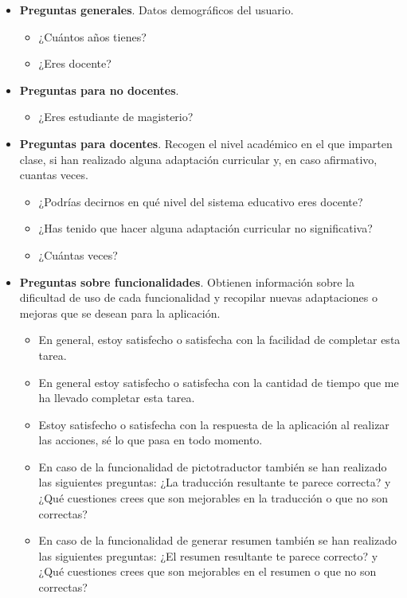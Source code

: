 \begin{itemize}
    \item \textbf{Preguntas generales}. Datos demográficos del usuario.
          \begin{itemize}
              \item ¿Cuántos años tienes?
              \item ¿Eres docente?
          \end{itemize}
    \item \textbf{Preguntas para no docentes}.
          \begin{itemize}
              \item ¿Eres estudiante de magisterio?
          \end{itemize}
    \item \textbf{Preguntas para docentes}. Recogen el nivel académico en el que imparten clase, si han realizado alguna adaptación curricular y, en caso afirmativo, cuantas veces.
          \begin{itemize}
              \item ¿Podrías decirnos en qué nivel del sistema educativo eres docente?
              \item ¿Has tenido que hacer alguna adaptación curricular no significativa?
              \item ¿Cuántas veces?
          \end{itemize}
    \item \textbf{Preguntas sobre funcionalidades}. Obtienen información sobre la
          dificultad de uso de cada funcionalidad y recopilar nuevas adaptaciones
          o mejoras que se desean para la aplicación.
          \begin{itemize}
              \item En general, estoy  satisfecho o satisfecha con la facilidad de completar esta tarea.
              \item En general estoy  satisfecho o satisfecha con la cantidad de tiempo que me ha llevado completar esta tarea.
              \item Estoy  satisfecho o satisfecha con la respuesta de la aplicación al realizar las acciones, sé lo que pasa en todo momento.
              \item En caso de la funcionalidad de pictotraductor también se han realizado las siguientes preguntas: ¿La traducción resultante te parece correcta? y ¿Qué cuestiones crees que son mejorables en la traducción o que no son correctas?
              \item En caso de la funcionalidad de generar resumen también se han realizado las siguientes preguntas: ¿El resumen resultante te parece correcto? y ¿Qué cuestiones crees que son mejorables en el resumen o que no son correctas?

\end{itemize}
\end{itemize}
